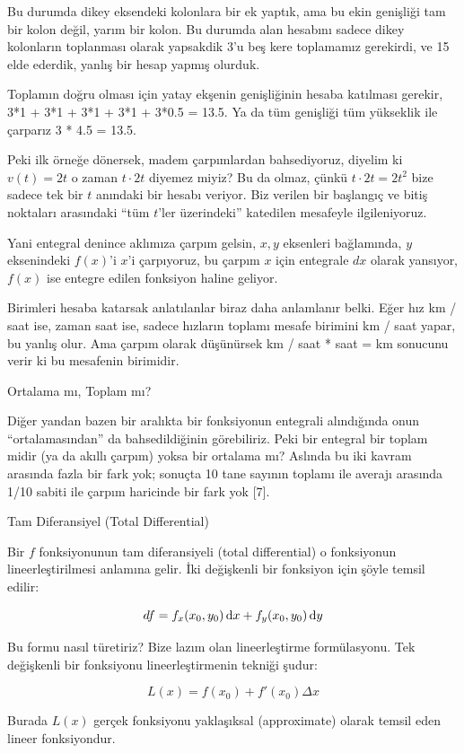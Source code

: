 \documentclass[12pt,fleqn]{article}\usepackage{../../common}
\begin{document}
Bu durumda dikey eksendeki kolonlara bir ek yaptık, ama bu ekin genişliği
tam bir kolon değil, yarım bir kolon. Bu durumda alan hesabını sadece dikey
kolonların toplanması olarak yapsakdik 3'u beş kere toplamamız gerekirdi,
ve 15 elde ederdik, yanlış bir hesap yapmış olurduk.

Toplamın doğru olması için yatay ekşenin genişliğinin hesaba katılması
gerekir, 3*1 + 3*1 + 3*1 + 3*1 + 3*0.5 = 13.5. Ya da tüm genişliği tüm
yükseklik ile çarparız 3 * 4.5 = 13.5. 

Peki ilk örneğe dönersek, madem çarpımlardan bahsediyoruz, diyelim ki
$v(t) = 2t$ o zaman $t \cdot 2t$ diyemez miyiz? Bu da olmaz, çünkü $t\cdot 2t = 2t^2$ 
bize sadece tek bir $t$ anındaki bir hesabı veriyor. Biz verilen bir 
başlangıç ve bitiş noktaları arasındaki ``tüm $t$'ler üzerindeki'' 
katedilen mesafeyle ilgileniyoruz.  

Yani entegral denince aklımıza çarpım gelsin, $x,y$ eksenleri bağlamında,
$y$ eksenindeki $f(x)$'i $x$'i çarpıyoruz, bu çarpım $x$ için entegrale
$dx$ olarak yansıyor, $f(x)$ ise entegre edilen fonksiyon haline geliyor. 

Birimleri hesaba katarsak anlatılanlar biraz daha anlamlanır belki. Eğer
hız km / saat ise, zaman saat ise, sadece hızların toplamı mesafe birimini
km / saat yapar, bu yanlış olur. Ama çarpım olarak düşünürsek km / saat *
saat = km sonucunu verir ki bu mesafenin birimidir. 

Ortalama mı, Toplam mı?

Diğer yandan bazen bir aralıkta bir fonksiyonun entegrali alındığında onun
``ortalamasından'' da bahsedildiğinin görebiliriz. Peki bir entegral bir
toplam midir (ya da akıllı çarpım) yoksa bir ortalama mı? Aslında bu iki
kavram arasında fazla bir fark yok; sonuçta 10 tane sayının toplamı ile
averajı arasında 1/10 sabiti ile çarpım haricinde bir fark yok [7]. 

Tam Diferansiyel (Total Differential)

Bir $f$ fonksiyonunun tam diferansiyeli (total differential) o
fonksiyonun lineerleştirilmesi anlamına gelir. İki değişkenli bir
fonksiyon için şöyle temsil edilir:

$$ df = f_x(x_0, y_0)\,\mathrm{d} x + f_y(x_0,y_0)\,\mathrm{d} y  $$

Bu formu nasıl türetiriz? Bize lazım olan lineerleştirme formülasyonu. Tek
değişkenli bir fonksiyonu lineerleştirmenin tekniği şudur:

$$ L(x) = f(x_0) + f'(x_0) \Delta x  $$

Burada $L(x)$ gerçek fonksiyonu yaklaşıksal (approximate) olarak temsil eden
lineer fonksiyondur. 
\end{document}
